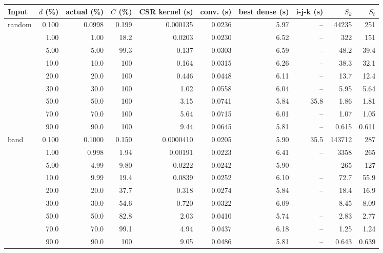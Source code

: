 \begin{tabular}{lrrrrrrrrr}
\toprule
Input & $d$ (\%) & actual (\%) & $C$ (\%) & CSR kernel (s) & conv. (s) & best dense (s) & i-j-k (s) & $S_k$ & $S_t$ \\
\midrule
random & 0.100 & 0.0998 & 0.199 & 0.000135 & 0.0236 & 5.97 & -- & 44235 & 251 \\
 & 1.00 & 1.00 & 18.2 & 0.0203 & 0.0230 & 6.52 & -- & 322 & 151 \\
 & 5.00 & 5.00 & 99.3 & 0.137 & 0.0303 & 6.59 & -- & 48.2 & 39.4 \\
 & 10.0 & 10.0 & 100 & 0.164 & 0.0315 & 6.26 & -- & 38.3 & 32.1 \\
 & 20.0 & 20.0 & 100 & 0.446 & 0.0448 & 6.11 & -- & 13.7 & 12.4 \\
 & 30.0 & 30.0 & 100 & 1.02 & 0.0558 & 6.04 & -- & 5.95 & 5.64 \\
 & 50.0 & 50.0 & 100 & 3.15 & 0.0741 & 5.84 & 35.8 & 1.86 & 1.81 \\
 & 70.0 & 70.0 & 100 & 5.64 & 0.0715 & 6.01 & -- & 1.07 & 1.05 \\
 & 90.0 & 90.0 & 100 & 9.44 & 0.0645 & 5.81 & -- & 0.615 & 0.611 \\
\midrule
band & 0.100 & 0.1000 & 0.150 & 0.0000410 & 0.0205 & 5.90 & 35.5 & 143712 & 287 \\
 & 1.00 & 0.998 & 1.94 & 0.00191 & 0.0223 & 6.41 & -- & 3358 & 265 \\
 & 5.00 & 4.99 & 9.80 & 0.0222 & 0.0242 & 5.90 & -- & 265 & 127 \\
 & 10.0 & 9.99 & 19.4 & 0.0839 & 0.0252 & 6.10 & -- & 72.7 & 55.9 \\
 & 20.0 & 20.0 & 37.7 & 0.318 & 0.0274 & 5.84 & -- & 18.4 & 16.9 \\
 & 30.0 & 30.0 & 54.6 & 0.720 & 0.0322 & 6.09 & -- & 8.45 & 8.09 \\
 & 50.0 & 50.0 & 82.8 & 2.03 & 0.0410 & 5.74 & -- & 2.83 & 2.77 \\
 & 70.0 & 70.0 & 99.1 & 4.94 & 0.0437 & 6.18 & -- & 1.25 & 1.24 \\
 & 90.0 & 90.0 & 100 & 9.05 & 0.0486 & 5.81 & -- & 0.643 & 0.639 \\
\bottomrule
\end{tabular}
